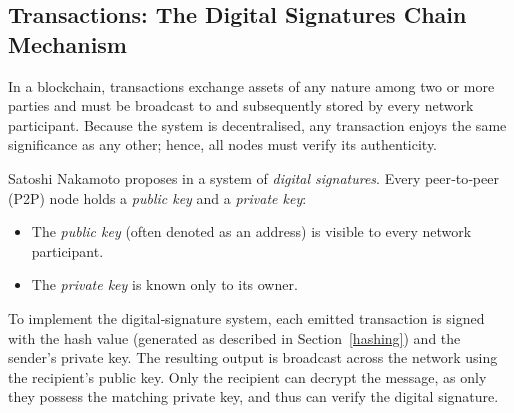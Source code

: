\subsection{Transactions: The Digital Signatures Chain Mechanism}\label{transazioni}
In a blockchain, transactions exchange assets of any nature among two or more parties and must be broadcast to and subsequently stored by every network participant. Because the system is decentralised, any transaction enjoys the same significance as any other; hence, all nodes must verify its authenticity.

Satoshi Nakamoto proposes in \cite{bitcoin} a system of \textit{digital signatures}. Every peer‑to‑peer (P2P) node holds a \textit{public key} and a \textit{private key}:
\begin{itemize}
    \item The \textit{public key} (often denoted as an address) is visible to every network participant.
    \item The \textit{private key} is known only to its owner.
\end{itemize}
To implement the digital‑signature system, each emitted transaction is signed with the hash value (generated as described in Section~\ref{hashing}) and the sender's private key. The resulting output is broadcast across the network using the recipient's public key. Only the recipient can decrypt the message, as only they possess the matching private key, and thus can verify the digital signature.


